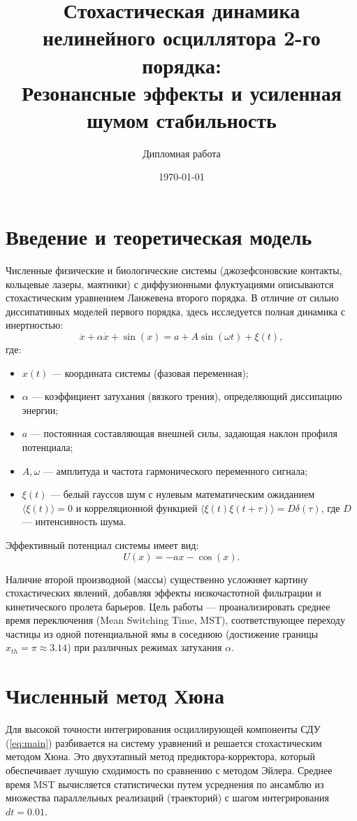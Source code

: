 \documentclass[12pt,a4paper]{article}
\title{Стохастическая динамика нелинейного осциллятора 2-го порядка:\\ Резонансные эффекты и усиленная шумом стабильность}
\author{Дипломная работа}
\date{\today}
\begin{document}
\maketitle

\section{Введение и теоретическая модель}
Численные физические и биологические системы (джозефсоновские контакты, кольцевые лазеры, маятники) с диффузионными флуктуациями описываются стохастическим уравнением Ланжевена второго порядка. В отличие от сильно диссипативных моделей первого порядка, здесь исследуется полная динамика с инертностью:
\begin{equation}
    \ddot{x} + \alpha \dot{x} + \sin(x) = a + A \sin(\omega t) + \xi(t),
    \label{eq:main}
\end{equation}
где:
\begin{itemize}
    \item $x(t)$ — координата системы (фазовая переменная);
    \item $\alpha$ — коэффициент затухания (вязкого трения), определяющий диссипацию энергии;
    \item $a$ — постоянная составляющая внешней силы, задающая наклон профиля потенциала;
    \item $A, \omega$ — амплитуда и частота гармонического переменного сигнала;
    \item $\xi(t)$ — белый гауссов шум с нулевым математическим ожиданием $\langle \xi(t) \rangle = 0$ и корреляционной функцией $\langle \xi(t)\xi(t+\tau) \rangle = D \delta(\tau)$, где $D$ — интенсивность шума.
\end{itemize}

Эффективный потенциал системы имеет вид:
\begin{equation}
    U(x) = -a x - \cos(x).
\end{equation}

Наличие второй производной (массы) существенно усложняет картину стохастических явлений, добавляя эффекты низкочастотной фильтрации и кинетического пролета барьеров. Цель работы — проанализировать среднее время переключения (Mean Switching Time, MST), соответствующее переходу частицы из одной потенциальной ямы в соседнюю (достижение границы $x_{th} = \pi \approx 3.14$) при различных режимах затухания $\alpha$.

\section{Численный метод Хюна}
Для высокой точности интегрирования осциллирующей компоненты СДУ (\ref{eq:main}) разбивается на систему уравнений и решается стохастическим методом Хюна. Это двухэтапный метод предиктора-корректора, который обеспечивает лучшую сходимость по сравнению с методом Эйлера. Среднее время MST вычисляется статистически путем усреднения по ансамблю из множества параллельных реализаций (траекторий) с шагом интегрирования $dt = 0.01$.
\end{document}
